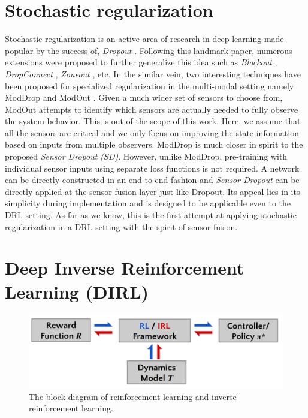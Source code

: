\documentclass[../thesis.tex]{subfiles}
\begin{document}
\section{Stochastic regularization}

Stochastic regularization is an active area of research in deep learning made popular by the success of, \textit{Dropout} \cite{dropout}. Following this landmark paper, numerous extensions were proposed  to further generalize this idea such as \textit{Blockout} \cite{blockout}, \textit{DropConnect} \cite{dropconnect}, \textit{Zoneout} \cite{zoneout}, etc. In the similar vein, two interesting techniques have been proposed for specialized regularization in the multi-modal setting namely ModDrop \cite{moddrop} and ModOut \cite{modout}. 
Given a much wider set of sensors to choose from, ModOut attempts to identify which sensors are actually needed to fully observe the system behavior. This is out of the scope of this work. Here, we assume that all the sensors are critical and we only focus on improving the state information based on inputs from multiple observers. 
ModDrop is much closer in spirit to the proposed \emph{Sensor Dropout (SD)}. However, unlike ModDrop, pre-training with individual sensor inputs using separate loss functions is not required. A network can be directly constructed in an end-to-end fashion and \emph{Sensor Dropout} can be directly applied at the sensor fusion layer just like Dropout. Its appeal lies in its simplicity during implementation and is designed to be applicable even to the DRL setting. As far as we know, this is the first attempt at applying stochastic regularization in a DRL setting with the spirit of sensor fusion. 



\section{Deep Inverse Reinforcement Learning (DIRL)} 
\label{sec:dirl_intro}


\begin{figure}[t]
	\begin{center}
		\centerline{\includegraphics[width=0.5\columnwidth]{./DIRL/fig/irl_rl_pipeline.png}}
		\caption{The block diagram of reinforcement learning and inverse reinforcement learning.}
		\label{fig:irl_rl}
	\end{center}
\end{figure} 
\end{document}

